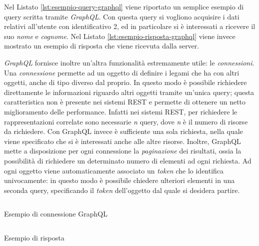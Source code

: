 Nel Listato \ref{lst:esempio-query-graphql} viene riportato un semplice esempio di query scritta tramite \emph{GraphQL}. Con questa query si vogliono acquisire i dati relativi all'utente con identificativo 2, ed in particolare si è interessati a ricevere il suo \emph{nome} e \emph{cognome}. Nel Listato \ref{lst:esempio-risposta-graphql} viene invece mostrato un esempio di risposta che viene ricevuta dalla server.

\emph{GraphQL} fornisce inoltre un'altra funzionalità estremamente utile: le \emph{connessioni}. Una \emph{connessione} permette ad un oggetto di definire i legami che ha con altri oggetti, anche di tipo diverso dal proprio. In questo modo è possibile richiedere direttamente le informazioni riguardo altri oggetti tramite un'unica query; questa caratteristica non è presente nei sistemi REST e permette di ottenere un netto miglioramento delle performance. Infatti nei sistemi REST, per richiedere le rappresentazioni correlate sono necessarie \emph{n} query, dove \emph{n} è il numero di risorse da richiedere. Con GraphQL invece è sufficiente una sola richiesta, nella quale viene specificato che si è interessati anche alle altre risorse. Inoltre, GraphQL mette a disposizione per ogni connessione la \emph{paginazione} dei risultati, ossia la possibilità di richiedere un determinato numero di elementi ad ogni richiesta. Ad ogni oggetto viene automaticamente associato un \emph{token} che lo identifica univocamente: in questo modo è possibile chiedere ulteriori elementi in una seconda query, specificando il \emph{token} dell'oggetto dal quale si desidera partire.

\begin{center}
	\hspace*{-1.5cm}
	\begin{minipage}[t]{0.63\textwidth}
		\begin{listing}[H]
			\inputminted{text}{2-nozioni-preliminari/Codice/esempio_connessione_graphql.graphql}
			\caption{Esempio di connessione GraphQL}
			\label{lst:esempio-connessione-graphql}
		\end{listing}
	\end{minipage}%
	\begin{minipage}[t]{0.63\textwidth}
		\begin{listing}[H]
			\inputminted{json}{2-nozioni-preliminari/Codice/esempio_risposta_connessione_graphql.json}
			\caption{Esempio di risposta}
			\label{lst:esempio-risposta-connessione-graphql}
		\end{listing}
	\end{minipage}	
\end{center}

